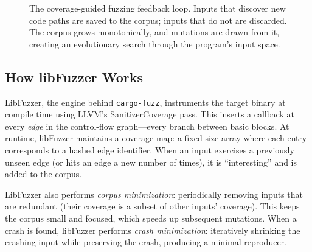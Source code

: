 \begin{figure}[ht]
\centering
{}
\caption{The coverage-guided fuzzing feedback loop. Inputs that discover new code paths are saved to the corpus; inputs that do not are discarded. The corpus grows monotonically, and mutations are drawn from it, creating an evolutionary search through the program's input space.}
\label{fig:fuzzing-loop}
\end{figure}

\subsection{How libFuzzer Works}

LibFuzzer, the engine behind \texttt{cargo-fuzz}, instruments the target binary at compile time using LLVM's SanitizerCoverage pass. This inserts a callback at every \emph{edge} in the control-flow graph---every branch between basic blocks. At runtime, libFuzzer maintains a coverage map: a fixed-size array where each entry corresponds to a hashed edge identifier. When an input exercises a previously unseen edge (or hits an edge a new number of times), it is ``interesting'' and is added to the corpus.

%
LibFuzzer also performs \emph{corpus minimization}: periodically removing inputs that are redundant (their coverage is a subset of other inputs' coverage). This keeps the corpus small and focused, which speeds up subsequent mutations. When a crash is found, libFuzzer performs \emph{crash minimization}: iteratively shrinking the crashing input while preserving the crash, producing a minimal reproducer.

